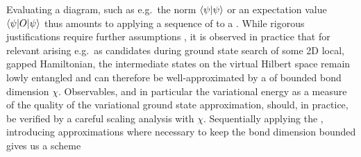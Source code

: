 Evaluating a  diagram, such as e.g.~the norm $\braket{\psi}{\psi}$ or an expectation value $\braopket{\psi}{O}{\psi}$ thus amounts to applying a sequence of  to a .
%
While rigorous justifications require further assumptions \cite{cirac2011, lubasch2014}, it is observed in practice that for relevant  arising e.g.~as candidates during ground state search of some 2D local, gapped Hamiltonian, the intermediate states on the virtual Hilbert space remain lowly entangled and can therefore be well-approximated by a  of bounded bond dimension $\chi$.
%
Observables, and in particular the variational energy as a measure of the quality of the variational ground state approximation, should, in practice, be verified by a careful scaling analysis with $\chi$.
%
Sequentially applying the , introducing approximations where necessary to keep the  bond dimension bounded gives us a scheme
%
